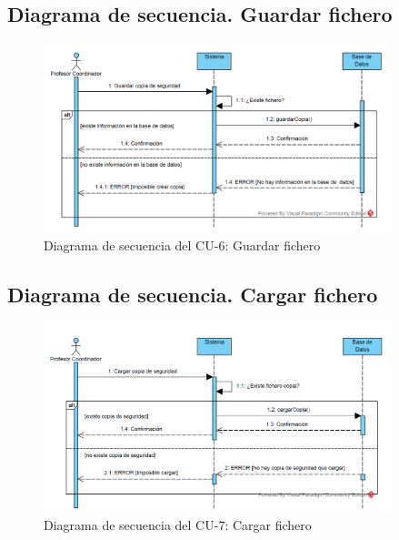 \newpage
\subsection{Diagrama de secuencia. Guardar fichero}
\begin{figure}[h!]
	\centering
	\includegraphics[width=0.9\textwidth]{../design/sd-6}
	\caption{Diagrama de secuencia del CU-6: Guardar fichero}
	\label{fig:sd006}
\end{figure}

\subsection{Diagrama de secuencia. Cargar fichero}
\begin{figure}[h!]
	\centering
	\includegraphics[width=0.9\textwidth]{../design/sd-7}
	\caption{Diagrama de secuencia del CU-7: Cargar fichero}
	\label{fig:sd007}
\end{figure}

\newpage
